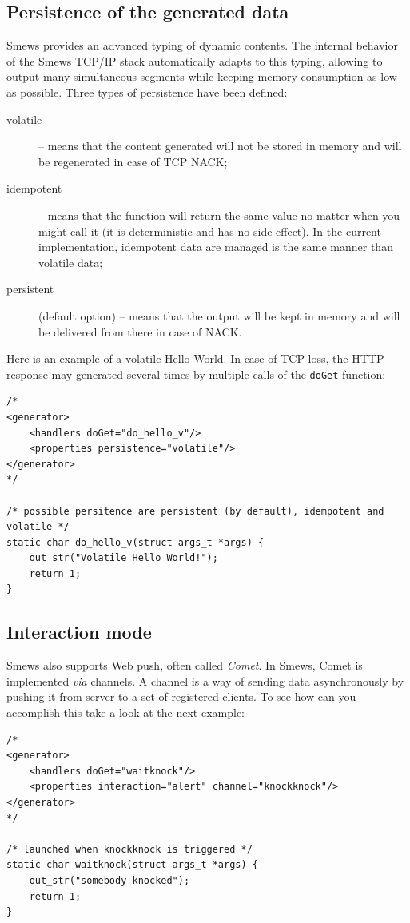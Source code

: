 \documentclass{report}
\begin{document}
\subsection{Persistence of the generated data}

Smews provides an advanced typing of dynamic contents. The internal behavior of the Smews TCP/IP stack automatically adapts to this typing, allowing to output many simultaneous segments while keeping memory consumption as low as possible. Three types of persistence have been defined:
\begin{description}
\item[volatile] -- means that the content generated will not be stored in memory and will be regenerated in case of TCP NACK;
\item[idempotent] -- means that the function will return the same value no matter when you might call it (it is deterministic and has no side-effect). In the current implementation, idempotent data are managed is the same manner than volatile data;
\item[persistent] (default option) -- means that the output will be kept in memory and will be delivered from there in case of NACK.
\end{description}

Here is an example of a volatile Hello World. In case of TCP loss, the HTTP response may generated several times by multiple calls of the \verb+doGet+ function:
\lstset{language=C}
\begin{lstlisting}
/*
<generator>
    <handlers doGet="do_hello_v"/>
    <properties persistence="volatile"/>
</generator>
*/

/* possible persitence are persistent (by default), idempotent and volatile */
static char do_hello_v(struct args_t *args) {
    out_str("Volatile Hello World!");
    return 1;
}
\end{lstlisting}

\subsection{Interaction mode}

Smews also supports Web push, often called \emph{Comet}. In Smews, Comet is implemented {\it via} channels. A channel is a way of sending data asynchronously by pushing it from server to a set of registered clients. To see how can you accomplish this take a look at the next example:
\lstset{language=C}
\begin{lstlisting}
/*
<generator>
    <handlers doGet="waitknock"/>
    <properties interaction="alert" channel="knockknock"/>
</generator>
*/

/* launched when knockknock is triggered */
static char waitknock(struct args_t *args) {
    out_str("somebody knocked");
    return 1;
}
\end{lstlisting}
\end{document}
